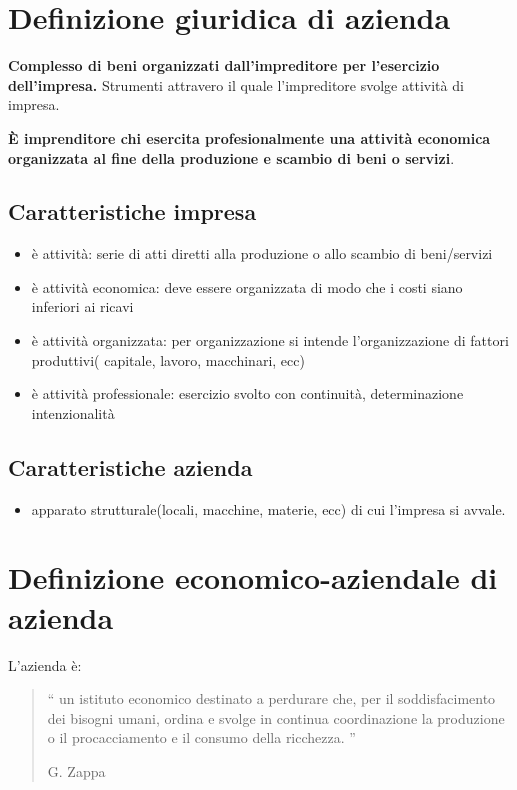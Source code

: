 \section{Definizione giuridica di azienda}
\textbf{Complesso di beni organizzati dall'impreditore per l'esercizio dell'impresa.}
Strumenti attravero il quale l'impreditore svolge attività di impresa.


\textbf{È imprenditore chi esercita profesionalmente una attività economica organizzata al fine della
produzione e scambio di beni o servizi}.

\subsection{Caratteristiche impresa}
\begin{itemize}
	\item è attività: serie di atti diretti alla produzione o allo scambio di beni/servizi
	\item è attività economica: deve essere organizzata di modo che i costi siano inferiori ai ricavi
	\item è attività organizzata: per organizzazione si intende l'organizzazione di fattori produttivi(
		capitale, lavoro, macchinari, ecc)
	\item è attività professionale: esercizio svolto con continuità, determinazione intenzionalità
\end{itemize}

\subsection{Caratteristiche azienda}
\begin{itemize}
	\item apparato strutturale(locali, macchine, materie, ecc) di cui l'impresa si avvale.
\end{itemize}


\section{Definizione economico-aziendale di azienda}

L'azienda è:\begin{quotation}
    `` un istituto economico destinato a perdurare che,
per il soddisfacimento dei bisogni umani, ordina e svolge in
continua coordinazione la produzione o il procacciamento e il
consumo della ricchezza. ''

G. Zappa
\end{quotation}

